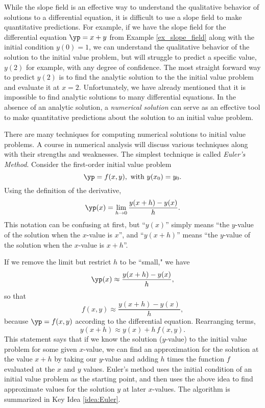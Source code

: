 While the slope field is an effective way to understand the qualitative behavior of solutions to a differential equation, it is difficult to use a slope field to make quantitative predictions.  For example, if we have the slope field for the differential equation $\yp = x+y$ from Example \ref{ex_slope_field} along with the initial condition $y(0)=1$, we can understand the qualitative behavior of the solution to the initial value problem, but will struggle to predict a specific value, $y(2)$ for example, with any degree of confidence. The most straight forward way to predict $y(2)$ is to find the analytic solution to the the initial value problem and evaluate it at $x=2$.  Unfortunately, we have already mentioned that it is impossible to find analytic solutions to many differential equations.  In the absence of an analytic solution, a \emph{numerical solution} can serve as an effective tool to make quantitative predictions about the solution to an initial value problem.

There are many techniques for computing numerical solutions to initial value problems. A course in numerical analysis will discuss various techniques along with their strengths and weaknesses. The simplest technique is called \emph{Euler's Method}.%
Consider the first-order initial value problem
\[\yp = f(x,y), \text{ with } y(x_0) = y_0.\]
Using the definition of the derivative,
\[\yp(x) = \lim_{h \to 0} \frac{y(x+h) - y(x)}{h}.\]
This notation can be confusing at first, but ``$y(x)$'' simply means ``the $y$-value of the solution when the $x$-value is $x$'', and ``$y(x+h)$'' means ``the $y$-value of the solution when the $x$-value is $x+h$''.

If we remove the limit but restrict $h$ to be ``small," we have
\[\yp(x) \approx \frac{y(x+h) - y(x)}{h},\]
so that
\[f(x,y) \approx \frac{y(x+h)-y(x)}{h},\]
because $\yp = f(x,y)$ according to the differential equation.  Rearranging terms,
\[y(x + h) \approx y(x) + h\,f(x,y).\]
This statement says that if we know the solution ($y$-value) to the initial value problem for some given $x$-value, we can find an approximation for the solution at the value $x+h$ by taking our  $y$-value and adding $h$ times the function $f$ evaluated at the $x$ and $y$ values. Euler's method uses the initial condition of an initial value problem as the starting point, and then uses the above idea to find approximate values for the solution $y$ at later $x$-values.  The algorithm is summarized in Key Idea \ref{idea:Euler}.

